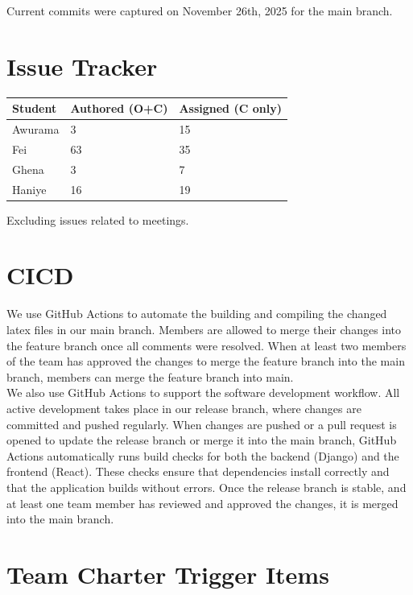 \documentclass{article}
\begin{document}
Current commits were captured on November 26th, 2025 for the main branch.
\section{Issue Tracker}

\begin{table}[H]
\centering
\begin{tabular}{lll}
\toprule
\textbf{Student} & \textbf{Authored (O+C)} & \textbf{Assigned (C only)}\\
\midrule
Awurama & 3 & 15 \\
Fei & 63 & 35 \\
Ghena & 3 & 7 \\
Haniye & 16 & 19 \\
\bottomrule
\end{tabular}
\end{table}

Excluding issues related to meetings.
\section{CICD}

We use GitHub Actions to automate the building and compiling the changed latex files in our main branch.
Members are allowed to merge their changes into the feature branch once all comments were resolved.
When at least two members of the team has approved the changes to merge the feature branch into the main branch, members can merge the feature branch into main.\\
We also use GitHub Actions to support the software development workflow. All active development takes place in our release branch, where changes are committed and pushed regularly. When changes are pushed or a pull request is opened to update the release branch or merge it into the main branch, GitHub Actions automatically runs build checks for both the backend (Django) and the frontend (React). These checks ensure that dependencies install correctly and that the application builds without errors. Once the release branch is stable, and at least one team member has reviewed and approved the changes, it is merged into the main branch.


\section{Team Charter Trigger Items}

\end{document}
